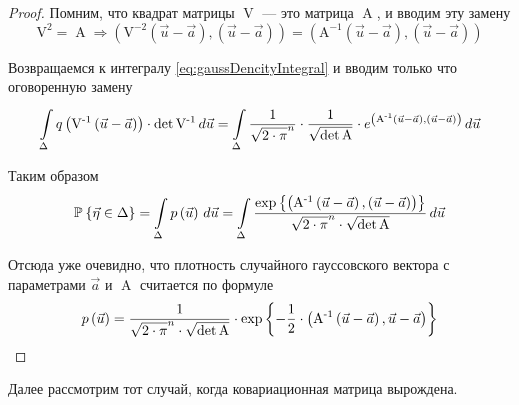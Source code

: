 \begin{proof}
    Помним, что квадрат матрицы $\operatorname{V}$ --- это матрица
    $\operatorname{A}$, и вводим эту замену
    $$\operatorname{V^2} = \operatorname{A} \Rightarrow
        \left( \operatorname{V^{-2}} \left( \vec{u} - \vec{a} \right),
          \left( \vec{u} - \vec{a} \right) \right)
        = \left( \operatorname{A^{-1}} \left( \vec{u} - \vec{a} \right),
          \left( \vec{u} - \vec{a} \right) \right)$$

  Возвращаемся к интегралу \eqref{eq:gaussDencityIntegral} и вводим
  только что оговоренную замену
  \begin{equation*}
     \integrall{\Delta}{d\vec{u}}{ q\left( \operatorname{V^{-1}}
        \left( \vec{u} - \vec{a} \right) \right)
    \cdot \det{\operatorname{V^{-1}}}}
    = \integrall{\Delta}{d\vec{u}}{\frac{1}{\sqrt{2 \cdot \pi}^n}
    \cdot \frac{1}{\sqrt{\det{\operatorname{A}}}}
    \cdot e^{\left( \operatorname{A^{-1}}
      \left( \vec{u} - \vec{a} \right),
        \left( \vec{u} - \vec{a} \right) \right)}}
  \end{equation*}

  Таким образом
  \begin{equation*}
    \Probability{\vec{\eta} \in \Delta}
    = \integrall{\Delta}{d\vec{u}}{\pdf{\vec{u}}}
    = \integrall{\Delta}{d\vec{u}}{
    \frac{\exp{\left\{\left( \operatorname{A^{-1}}
      \left( \vec{u} - \vec{a} \right),
        \left( \vec{u} - \vec{a} \right) \right) \right\}}}{
        \sqrt{2 \cdot \pi}^n \cdot \sqrt{\det{\operatorname{A}}}}}
  \end{equation*}

  Отсюда уже очевидно, что плотность случайного гауссовского вектора с
  параметрами $\vec{a}$ и $\operatorname{A}$ считается по формуле
  $$\pdf{\vec{u}}
      = \frac{1}{\sqrt{2 \cdot \pi}^n \cdot \sqrt{\det{\operatorname{A}}}}
      \cdot \exp{\left\{ -\frac{1}{2} \cdot \left(
          \operatorname{A^{-1}} \left( \vec{u} - \vec{a} \right),
          \vec{u} - \vec{a} \right) \right\}}$$
\end{proof}

Далее рассмотрим тот случай, когда ковариационная матрица
вырождена.

